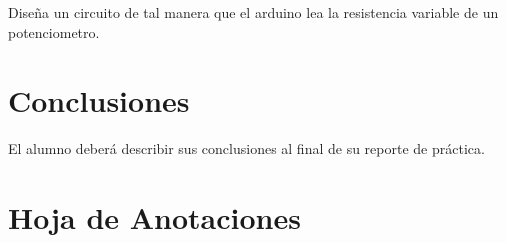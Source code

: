 	Diseña un circuito de tal manera que el arduino lea la resistencia variable de un potenciometro.


\section{Conclusiones}
	El alumno deberá describir sus conclusiones al final de su reporte de práctica.


\clearpage
\section{Hoja de Anotaciones}

